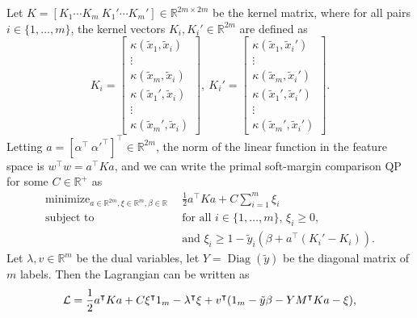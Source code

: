 \documentclass{article}
\newcommand{\RR}{\mathbb R}
\DeclareMathOperator*{\Diag}{Diag}
\DeclareMathOperator*{\minimize}{minimize}
\begin{document}
Let $K=[K_1\cdots K_m\ K_1'\cdots K_m']\in\RR^{2m\times 2m}$ be the
kernel matrix, where for all pairs $i\in\{1, \dots, m\}$, the kernel
vectors $K_i,K_i'\in\RR^{2m}$ are defined as
\begin{equation}
  K_i = \left[
    \begin{array}{c}
      \kappa(\tilde x_1, \tilde x_i)\\
      \vdots\\
      \kappa(\tilde x_m, \tilde x_i)\\
      \kappa(\tilde x_1', \tilde x_i)\\
      \vdots\\
      \kappa(\tilde x_m', \tilde x_i)
    \end{array}
  \right],\ 
  K_i' = \left[
    \begin{array}{c}
      \kappa(\tilde x_1, \tilde x_i')\\
      \vdots\\
      \kappa(\tilde x_m, \tilde x_i')\\
      \kappa(\tilde x_1', \tilde x_i')\\
      \vdots\\
      \kappa(\tilde x_m', \tilde x_i')
    \end{array}
  \right].
\end{equation}
Letting $a=[\alpha^\intercal\
\alpha'^\intercal]^\intercal\in\RR^{2m}$, the norm of the linear
function in the feature space is $w^\intercal w = a^\intercal K a$,
and we can write the primal soft-margin comparison QP for some
$C\in\RR^+$ as
\begin{equation}
  \begin{aligned}
      \minimize_{a\in\RR^{2m},\xi\in\RR^m,\beta\in\RR}\ \ & 
      \frac 1 2 a^\intercal K a + C\sum_{i=1}^m \xi_i \\
      \text{subject to}\ \ & 
      \text{for all $i\in\{1,\dots,m\}$, }
      \xi_i \geq 0,\\
      &\text{and }
      \xi_i \geq 1-\tilde y_i(\beta + a^\intercal (K_i'-K_i)).
  \end{aligned}
\end{equation}
Let $\lambda, v\in\RR^m$ be the dual variables, let $Y=\Diag(\tilde
y)$ be the diagonal matrix of $m$ labels. Then the Lagrangian can be
written as
\begin{equation}
  \label{eq:lagrangian}
  \mathcal L = \frac 1 2 a^\intercal K a + C\xi^\intercal 1_{m}\\
  -\lambda^\intercal \xi + v^\intercal(1_m - \tilde y\beta - Y M^\intercal K a - \xi),
\end{equation}
\end{document}
